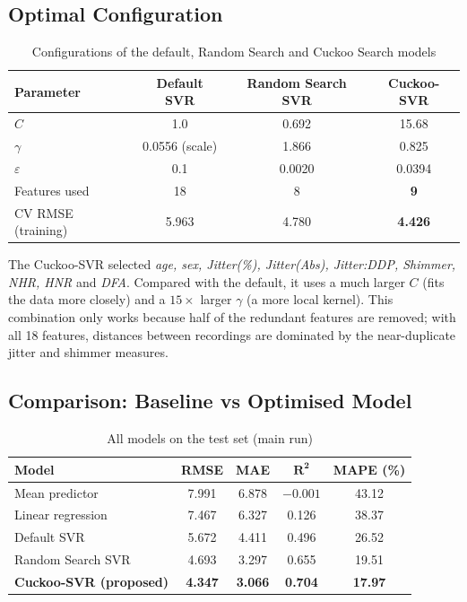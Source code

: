 \documentclass[12pt,a4paper]{article}
\numberwithin{equation}{section}
\numberwithin{table}{section}
\numberwithin{figure}{section}
\begin{document}
\subsection{Optimal Configuration}
\begin{table}[H]
\centering
\caption{Configurations of the default, Random Search and Cuckoo Search models}
\label{tab:bestparams}
\small
\begin{tabular}{@{}lccc@{}}
\toprule
\textbf{Parameter} & \textbf{Default SVR} & \textbf{Random Search SVR} & \textbf{Cuckoo-SVR} \\ \midrule
$C$ & 1.0 & 0.692 & 15.68 \\
$\gamma$ & 0.0556 (scale) & 1.866 & 0.825 \\
$\varepsilon$ & 0.1 & 0.0020 & 0.0394 \\
Features used & 18 & 8 & \textbf{9} \\
CV RMSE (training) & 5.963 & 4.780 & \textbf{4.426} \\ \bottomrule
\end{tabular}
\end{table}

The Cuckoo-SVR selected \textit{age, sex, Jitter(\%), Jitter(Abs), Jitter:DDP, Shimmer, NHR, HNR} and \textit{DFA}. Compared with the default, it uses a much larger $C$ (fits the data more closely) and a $15\times$ larger $\gamma$ (a more local kernel). This combination only works because half of the redundant features are removed; with all 18 features, distances between recordings are dominated by the near-duplicate jitter and shimmer measures.

\subsection{Comparison: Baseline vs Optimised Model}
\begin{table}[H]
\centering
\caption{All models on the test set (main run)}
\label{tab:all}
\small
\begin{tabular}{@{}lcccc@{}}
\toprule
\textbf{Model} & \textbf{RMSE} & \textbf{MAE} & $\mathbf{R^2}$ & \textbf{MAPE (\%)} \\ \midrule
Mean predictor & 7.991 & 6.878 & $-0.001$ & 43.12 \\
Linear regression & 7.467 & 6.327 & 0.126 & 38.37 \\
Default SVR & 5.672 & 4.411 & 0.496 & 26.52 \\
Random Search SVR & 4.693 & 3.297 & 0.655 & 19.51 \\
\textbf{Cuckoo-SVR (proposed)} & \textbf{4.347} & \textbf{3.066} & \textbf{0.704} & \textbf{17.97} \\ \bottomrule
\end{tabular}
\end{table}
\end{document}
